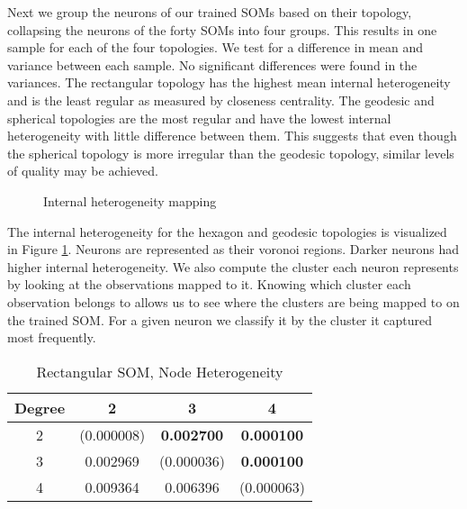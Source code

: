 Next we group the neurons of our trained SOMs based on their topology,
collapsing the neurons of the forty SOMs into four groups.  This results in one
sample for each of the four topologies.  We test for a difference in mean and
variance between each sample. No significant differences were found in the
variances.  The rectangular topology has the highest mean internal heterogeneity
and is the least regular as measured by closeness centrality. The geodesic and
spherical topologies are the most regular and have the lowest internal
heterogeneity with little difference between them.  This suggests that even
though the spherical topology is more irregular than the geodesic topology,
similar levels of quality may be achieved. 

\begin{figure}[htb]
\centering
\caption{Internal heterogeneity mapping}
\label{cluster}
\end{figure}

The internal heterogeneity for the hexagon and geodesic topologies is visualized
in Figure \ref{cluster}.  Neurons are represented as their voronoi regions.
Darker neurons had higher internal heterogeneity.  We also compute the cluster
each neuron represents by looking at the observations mapped to it.  Knowing
which cluster each observation belongs to allows us to see where the clusters
are being mapped to on the trained SOM. For a given neuron we classify it by
the cluster it captured most frequently.
\begin{table}[htb]
\centering
\scriptsize
\caption{Rectangular SOM, Node Heterogeneity}
\label{rectHet}
   \begin{tabular}{|c||c|c|c|}
    \hline
    Degree&2&3&4\\\hline
    \hline
    2 & (0.000008) & \textbf{0.002700} & \textbf{0.000100}\\\hline
    3 & 0.002969 & (0.000036) & \textbf{0.000100}\\\hline
    4 & 0.009364 & 0.006396 & (0.000063)\\\hline
    \end{tabular}
\end{table}

